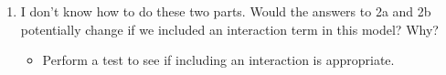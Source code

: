 \documentclass[12pt,letterpaper]{article}
\begin{document}
\begin{enumerate}
\begin{enumerate}
	\end{enumerate}
	\item
	I don't know how to do these two parts.
	Would the answers to 2a and 2b potentially change if we included an interaction term in this model? Why? 
	\begin{itemize}
		\item Perform a test to see if including an interaction is appropriate.
	\end{itemize}
	\end{enumerate}
\end{document}
